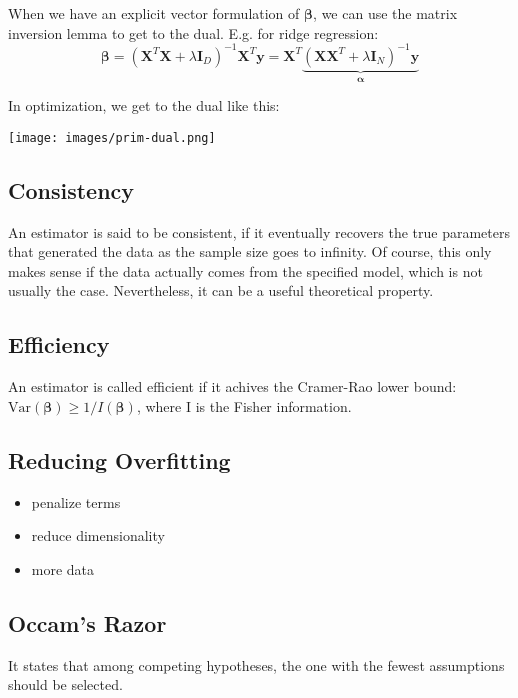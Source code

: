 \documentclass[10pt,a4paper,landscape]{article}
\renewcommand{\bf}[1]{\ensuremath{\mathbf{#1}}}
\newcommand{\Var}{\mathrm{Var}}
\newcommand{\balpha}{\boldsymbol\alpha}
\newcommand{\bbeta}{\boldsymbol\beta}
\begin{document}
\begin{multicols*}{4}
When we have an explicit vector formulation of $\bbeta$, we can use the matrix inversion lemma to get to the dual. E.g. for ridge regression:
$$\bbeta = (\bf{X}^T \bf{X}  + \lambda \bf{I}_D)^{-1} \bf{X}^T \bf{y}= \bf{X}^T \underbrace{(\bf{X X}^T + \lambda \bf{I}_N)^{-1} \bf{y}}_{\balpha}$$

In optimization, we get to the dual like this:
\begin{colfig}
  \centering
  \texttt{[image: images/prim-dual.png]}
\end{colfig}

\subsection{Consistency}
An estimator is said to be consistent, if it eventually recovers the true parameters that generated the data as the sample size goes to infinity. Of course, this only makes sense if the data actually comes from the specified model, which is not usually the case. Nevertheless, it can be a useful theoretical property.

\subsection{Efficiency}
An estimator is called efficient if it achives the Cramer-Rao lower bound:
$\Var{(\bbeta)} \geq 1/I(\bbeta)$, where I is the Fisher information.

\subsection{Reducing Overfitting}
\begin{itemize}[itemsep=0pt]
\item penalize terms
\item reduce dimensionality
\item more data
\end{itemize}

\subsection{Occam's Razor}
It states that among competing hypotheses, the one with the fewest assumptions should be selected. %



\end{multicols*}
\end{document}
